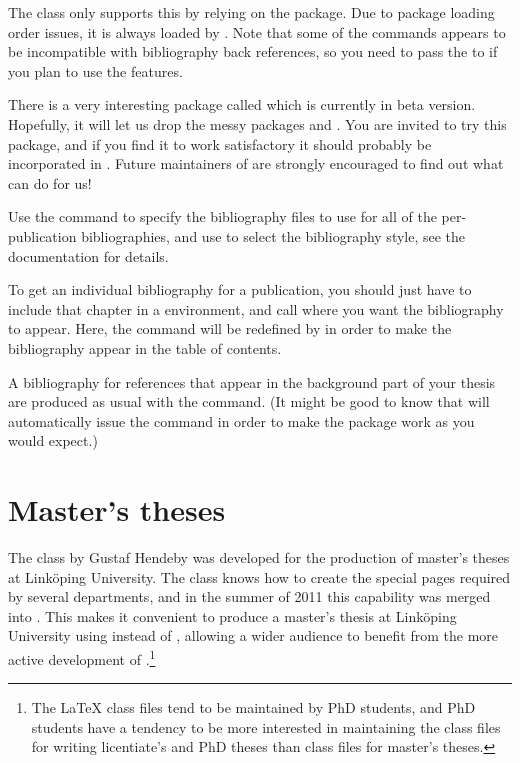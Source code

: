 The \rtthesis class only supports this by relying on the  package.  Due to package loading order issues, it is always loaded by \rtthesis.  Note that some of the  commands appears to be incompatible with bibliography back references, so you need to pass the  to \rtthesis if you plan to use the  features.

\begin{remark}
  There is a very interesting package called  which is currently in beta version.  Hopefully, it will let us drop the messy packages  and .  You are invited to try this package, and if you find it to work satisfactory it should probably be incorporated in \rtthesis.  Future maintainers of \rtthesis are strongly encouraged to find out what  can do for us!
\end{remark}

Use the command  to specify the bibliography files to use for all of the per-publication bibliographies, and use  to select the bibliography style, see the  documentation for details.

To get an individual bibliography for a publication, you should just have to include that chapter in a  environment, and call  where you want the bibliography to appear.  Here, the  command will be redefined by \rtthesis in order to make the bibliography appear in the table of contents.

A bibliography for references that appear in the background part of your thesis are produced as usual with the  command.  (It might be good to know that \rtthesis will automatically issue the  command in order to make the  package work as you would expect.)

\section{Master's theses}\label{sec:msc}
%
The  class by Gustaf Hendeby was developed for the production of master's theses at Linköping University.  The class knows how to create the special pages required by several departments, and in the summer of 2011 this capability was merged into \rtthesis.  This makes it convenient to produce a master's thesis at Linköping University using \rtthesis instead of , allowing a wider audience to benefit from the more active development of \rtthesis.\footnote{The \LaTeX{} class files tend to be maintained by PhD students, and PhD students have a tendency to be more interested in maintaining the class files for writing licentiate's and PhD theses than class files for master's theses.}

